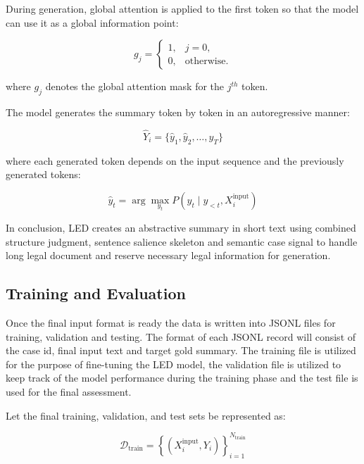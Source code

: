 \documentclass[11pt, a4paper]{article}
\theoremstyle{plain}%
\theoremstyle{remark}%
\theoremstyle{definition}%
\begin{document}
During generation, global attention is applied to the first token so that the model can use it as a global information point:

\begin{equation}
g_j =
\begin{cases}
1, & j = 0, \\
0, & \text{otherwise}.
\end{cases}
\end{equation}

where \(g_j\) denotes the global attention mask for the \(j^{th}\) token.

The model generates the summary token by token in an autoregressive manner:

\begin{equation}
\hat{Y}_i =
\{\hat{y}_1, \hat{y}_2, \ldots, \hat{y}_T\}
\end{equation}

where each generated token depends on the input sequence and the previously generated tokens:

\begin{equation}
\hat{y}_t =
\arg\max_{y_t} P\left(y_t \mid y_{<t}, X_i^{\text{input}}\right)
\end{equation}

In conclusion, LED creates an abstractive summary in short text using combined structure judgment, sentence salience skeleton and semantic case signal to handle long legal document and reserve necessary legal information for generation.

\subsection{Training and Evaluation}
Once the final input format is ready the data is written into JSONL files for training, validation and testing. The format of each JSONL record will consist of the case id, final input text and target gold summary. The training file is utilized for the purpose of fine-tuning the LED model, the validation file is utilized to keep track of the model performance during the training phase and the test file is used for the final assessment.

Let the final training, validation, and test sets be represented as:

\begin{equation}
\mathcal{D}_{\text{train}} =
\left\{ \left(X_i^{\text{input}}, Y_i\right) \right\}_{i=1}^{N_{\text{train}}}
\end{equation}
\end{document}
